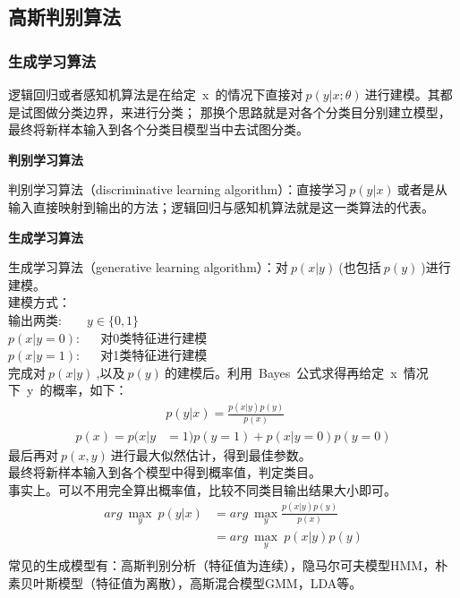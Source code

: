 \newpage
\subsection{高斯判别算法}
\subsubsection{生成学习算法}
逻辑回归或者感知机算法是在给定~x~的情况下直接对$~p(y|x;\theta)~$进行建模。其都是试图做分类边界，来进行分类；
那换个思路就是对各个分类目分别建立模型，最终将新样本输入到各个分类目模型当中去试图分类。

\noindent\textbf{判别学习算法}\par
判别学习算法（discriminative learning algorithm）：直接学习$~p(y|x)~$或者是从输入直接映射到输出的方法；逻辑回归与感知机算法就是这一类算法的代表。

\noindent\textbf{生成学习算法}\par
生成学习算法（generative learning algorithm）：对$~p(x|y)~$(也包括$~p(y)~$)进行建模。\\
建模方式：\\
输出两类:~~~~$y\in\{0,1\}$\\
$p(x|y=0):$~~~对0类特征进行建模\\
$p(x|y=1):$~~~对1类特征进行建模\\
完成对$~p(x|y)~$,以及$~p(y)~$的建模后。利用~Bayes~公式求得再给定~x~情况下~y~的概率，如下：
\begin{equation}\nonumber
\begin{split}
  &p(y|x)=\frac{p(x|y)p(y)}{p(x)}\\
  p(x)=p(x|y&=1)p(y=1)+p(x|y=0)p(y=0)
\end{split}
\end{equation}
最后再对$~p(x,y)~$进行最大似然估计，得到最佳参数。\\
最终将新样本输入到各个模型中得到概率值，判定类目。\\
事实上。可以不用完全算出概率值，比较不同类目输出结果大小即可。
\begin{equation}\nonumber
\begin{split}
  arg~\mathop{max}_y~p(y|x)&=arg~\mathop{max}_y\frac{p(x|y)p(y)}{p(x)}\\
  &=arg~\mathop{max}_y~p(x|y)p(y)\\
\end{split}
\end{equation}
常见的生成模型有：高斯判别分析（特征值为连续），隐马尔可夫模型HMM，朴素贝叶斯模型（特征值为离散），高斯混合模型GMM，LDA等。

